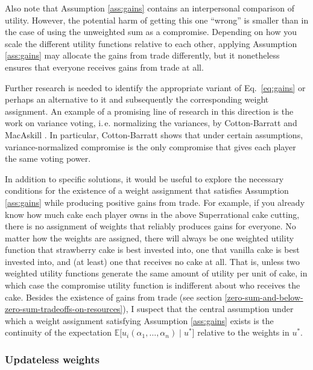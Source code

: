 Also note that Assumption \ref{ass:gains} contains an interpersonal comparison of
utility. However, the potential harm of getting this one ``wrong'' is
smaller than in the case of using the unweighted sum as a compromise.
Depending on how you scale the different utility functions relative to
each other, applying Assumption \ref{ass:gains} may allocate the gains from trade
differently, but it nonetheless ensures that everyone receives gains
from trade at all.

Further research is needed to identify the appropriate variant of Eq.~\eqref{eq:gains} or
perhaps an alternative to it and subsequently the corresponding weight
assignment. An example of a promising line of research in this direction
is the work on variance voting, i.\,e. normalizing the variances, by
Cotton-Barratt \citeyear{Cotton-Barratt2013-ql} and
MacAskill \citeyear{MacAskill2014-ca}. In particular,
Cotton-Barratt shows that under certain assumptions, variance-normalized
compromise is the only compromise that gives each player the same voting
power.

In addition to specific solutions, it would be useful to explore the
necessary conditions for the existence of a weight assignment that
satisfies Assumption \ref{ass:gains} while producing positive gains from trade. For
example, if you already know how much cake each player owns in the above
Superrational cake cutting, there is no assignment of weights that
reliably produces gains for everyone. No matter how the weights are
assigned, there will always be one weighted utility function that
strawberry cake is best invested into, one that vanilla cake is best
invested into, and (at least) one that receives no cake at all. That is,
unless two weighted utility functions generate the same amount of
utility per unit of cake, in which case the compromise utility function
is indifferent about who receives the cake. Besides the existence of
gains from trade (see section
\ref{zero-sum-and-below-zero-sum-tradeoffs-on-resources}), I suspect that the
central assumption under which a weight assignment satisfying Assumption \ref{ass:gains} exists is the
continuity of the expectation
\(\mathbb{E}\lbrack u_{i}(\alpha_{1},\dotsc,\alpha_{n})\mid u^{*}\rbrack\) relative to
the weights in \(u^{*}\).

\hypertarget{updateless-weights}{\subsubsection{Updateless
weights}\label{updateless-weights}}

